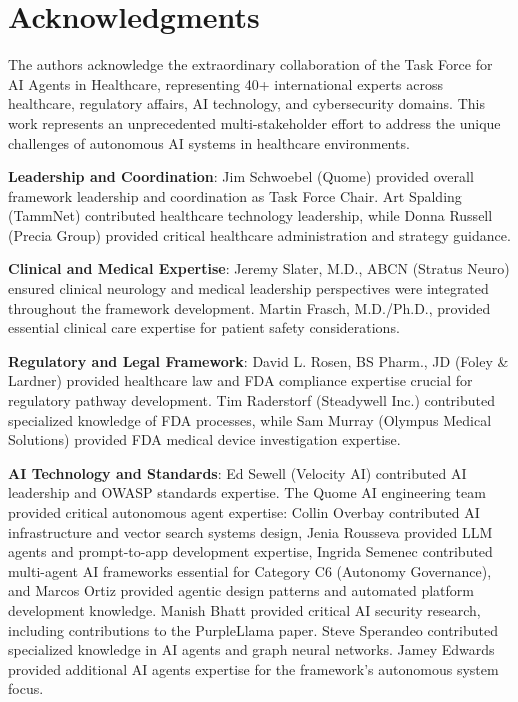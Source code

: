 \documentclass[11pt]{article}
\begin{document}
\section*{Acknowledgments}

The authors acknowledge the extraordinary collaboration of the Task Force for AI Agents in Healthcare, representing 40+ international experts across healthcare, regulatory affairs, AI technology, and cybersecurity domains. This work represents an unprecedented multi-stakeholder effort to address the unique challenges of autonomous AI systems in healthcare environments.

\textbf{Leadership and Coordination}: Jim Schwoebel (Quome) provided overall framework leadership and coordination as Task Force Chair. Art Spalding (TammNet) contributed healthcare technology leadership, while Donna Russell (Precia Group) provided critical healthcare administration and strategy guidance.

\textbf{Clinical and Medical Expertise}: Jeremy Slater, M.D., ABCN (Stratus Neuro) ensured clinical neurology and medical leadership perspectives were integrated throughout the framework development. Martin Frasch, M.D./Ph.D., provided essential clinical care expertise for patient safety considerations.

\textbf{Regulatory and Legal Framework}: David L. Rosen, BS Pharm., JD (Foley \& Lardner) provided healthcare law and FDA compliance expertise crucial for regulatory pathway development. Tim Raderstorf (Steadywell Inc.) contributed specialized knowledge of FDA processes, while Sam Murray (Olympus Medical Solutions) provided FDA medical device investigation expertise.

\textbf{AI Technology and Standards}: Ed Sewell (Velocity AI) contributed AI leadership and OWASP standards expertise. The Quome AI engineering team provided critical autonomous agent expertise: Collin Overbay contributed AI infrastructure and vector search systems design, Jenia Rousseva provided LLM agents and prompt-to-app development expertise, Ingrida Semenec contributed multi-agent AI frameworks essential for Category C6 (Autonomy Governance), and Marcos Ortiz provided agentic design patterns and automated platform development knowledge. Manish Bhatt provided critical AI security research, including contributions to the PurpleLlama paper. Steve Sperandeo contributed specialized knowledge in AI agents and graph neural networks. Jamey Edwards provided additional AI agents expertise for the framework's autonomous system focus.
\end{document}
